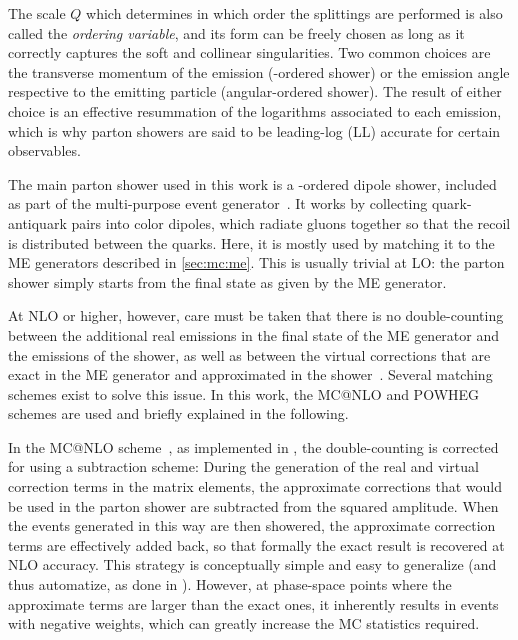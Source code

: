 The scale $Q$ which determines in which order the splittings are performed is also called the \textit{ordering variable}, and its form can be freely chosen as long as it correctly captures the soft and collinear singularities. Two common choices are the transverse momentum of the emission (\pt-ordered shower) or the emission angle respective to the emitting particle (angular-ordered shower). The result of either choice is an effective resummation of the logarithms associated to each emission, which is why parton showers are said to be leading-log (LL) accurate for certain observables.

The main parton shower used in this work is a \pt-ordered dipole shower, included as part of the \pythia multi-purpose event generator~\cite{Pythia:2015,Pythia:2022}. It works by collecting quark-antiquark pairs into color dipoles, which radiate gluons together so that the recoil is distributed between the quarks. Here, it is mostly used by matching it to the ME generators described in \cref{sec:mc:me}. This is usually trivial at LO: the parton shower simply starts from the final state as given by the ME generator.

At NLO or higher, however, care must be taken that there is no double-counting between the additional real emissions in the final state of the ME generator and the emissions of the shower, as well as between the virtual corrections that are exact in the ME generator and approximated in the shower~\cite{Skands:2012ts}. Several matching schemes exist to solve this issue. In this work, the MC@NLO and POWHEG schemes are used and briefly explained in the following.

In the MC@NLO scheme~\cite{Frixione:2002ik}, as implemented in \amcatnlo, the double-counting is corrected for using a subtraction scheme: During the generation of the real and virtual correction terms in the matrix elements, the approximate corrections that would be used in the parton shower are subtracted from the squared amplitude. When the events generated in this way are then showered, the approximate correction terms are effectively added back, so that formally the exact result is recovered at NLO accuracy. This strategy is conceptually simple and easy to generalize (and thus automatize, as done in \amcatnlo). However, at phase-space points where the approximate terms are larger than the exact ones, it inherently results in events with negative weights, which can greatly increase the MC statistics required.

